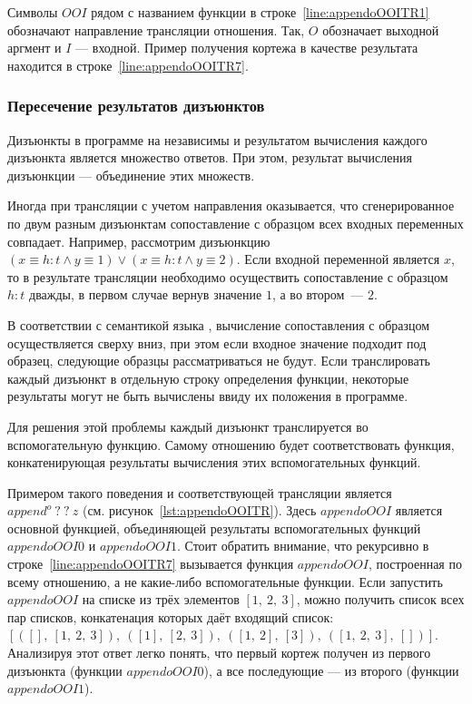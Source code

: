 Символы $OOI$ рядом с названием функции в строке~\ref{line:appendoOOITR1} обозначают направление трансляции отношения.
Так, $O$ обозначает выходной аргмент и $I$ --- входной.
Пример получения кортежа в качестве результата находится в строке~\ref{line:appendoOOITR7}.


\subsubsection{Пересечение результатов дизъюнктов}

Дизъюнкты в программе на \miniKanren{} независимы и результатом вычисления каждого дизъюнкта является множество ответов.
При этом, результат вычисления дизъюнкции --- объединение этих множеств.

Иногда при трансляции с учетом направления оказывается, что сгенерированное по двум разным дизъюнктам сопоставление с образцом всех входных переменных совпадает.
Например, рассмотрим дизъюнкцию $(x \equiv h:t \wedge y \equiv 1) \vee (x \equiv h:t \wedge y \equiv 2)$.
Если входной переменной является $x$, то в результате трансляции необходимо осуществить сопоставление с образцом $h:t$ дважды, в первом случае вернув значение $1$, а во втором~--- $2$.

В соответствии с семантикой языка \haskell{}, вычисление сопоставления с образцом осуществляется сверху вниз, при этом если входное значение подходит под образец, следующие образцы рассматриваться не будут.
Если транслировать каждый дизъюнкт в отдельную строку определения функции, некоторые результаты могут не быть вычислены ввиду их положения в программе.

Для решения этой проблемы каждый дизъюнкт транслируется во вспомогательную функцию.
Самому отношению будет соответствовать функция, конкатенирующая результаты вычисления этих вспомогательных функций.

Примером такого поведения и соответствующей трансляции является $append^o \ ? \ ? \ z$ (см. рисунок~\ref{lst:appendoOOITR}).
Здесь $appendoOOI$ является основной функцией, объединяющей результаты вспомогательных функций $appendoOOI0$ и $appendoOOI1$.
Стоит обратить внимание, что рекурсивно в строке~\ref{line:appendoOOITR7} вызывается функция $appendoOOI$, построенная по всему отношению, а не какие-либо вспомогательные функции.
Если запустить $appendoOOI$ на списке из трёх элементов $[1,~2,~3]$, можно получить список всех пар списков, конкатенация которых даёт входящий список: \\ $[([],~[1,~2,~3]),~([1],~[2,~3]),~([1,~2],~[3]),~([1,~2,~3],~[])]$.
Анализируя этот ответ легко понять, что первый кортеж получен из первого дизъюнкта (функции $appendoOOI0$), а все последующие --- из второго (функции $appendoOOI1$).

